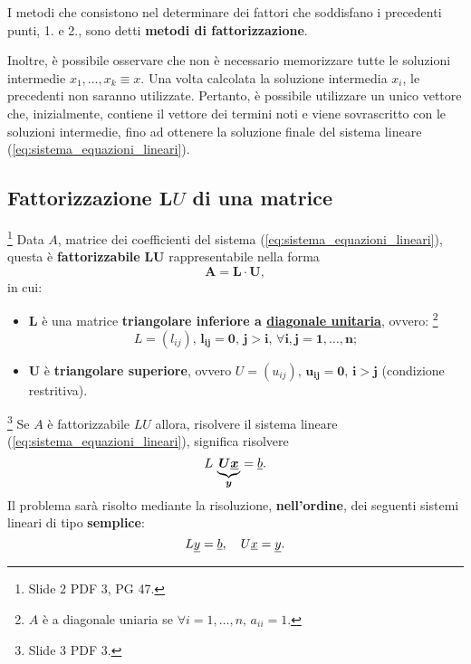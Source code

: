 I metodi che consistono nel determinare dei fattori che soddisfano i precedenti punti, 1. e 2., sono detti \textbf{metodi di fattorizzazione}.

Inoltre, è possibile osservare che non è necessario memorizzare tutte le soluzioni intermedie $x_1,\hdots, x_k\equiv x$. Una volta calcolata la soluzione intermedia $x_i$, le precedenti non saranno utilizzate. Pertanto, è possibile utilizzare un unico vettore che, inizialmente, contiene il vettore dei termini noti e viene sovrascritto con le soluzioni intermedie, fino ad ottenere la soluzione finale del sistema lineare (\ref{eq:sistema_equazioni_lineari}).

\subsection{Fattorizzazione \texorpdfstring{$\boldsymbol LU$}{LU} di una matrice}
\begin{definition}\footnote{Slide 2 PDF 3, PG 47.}
    Data $A$, matrice dei coefficienti del sistema (\ref{eq:sistema_equazioni_lineari}), questa è \textbf{fattorizzabile} $\boldsymbol{LU}$ rappresentabile nella forma
    \begin{equation}\label{eq:ALU}
        \boldsymbol{A=L\cdot U},
    \end{equation}
    in cui:
    \begin{itemize}
        \item $\boldsymbol L$ è una matrice \textbf{triangolare inferiore a \ul{diagonale unitaria}}, ovvero: \footnote{$A$ è a diagonale uniaria se $\forall i=1,\hdots, n,\, a_{ii}=1$.}
        \begin{equation*}
            L=(l_{ij}),\, \boldsymbol{l_{ij}=0,\, j>i,\, \forall i,j=1,\hdots, n};
        \end{equation*}
        \item $\boldsymbol U$ è \textbf{triangolare superiore}, ovvero $U=(u_{ij}),\, \boldsymbol{u_{ij}=0,\, i>j}$ (condizione restritiva).
    \end{itemize}
\end{definition}

\begin{remark}\footnote{Slide 3 PDF 3.}
    Se $A$ è fattorizzabile $LU$ allora, risolvere il sistema lineare (\ref{eq:sistema_equazioni_lineari}), significa risolvere
    \begin{equation*}
        L\, \underbrace{\boldsymbol{U\uline x}}_{\boldsymbol y}= \uline b.
    \end{equation*}
    Il problema sarà risolto mediante la risoluzione, \textbf{nell'ordine}, dei seguenti sistemi lineari di tipo \textbf{semplice}:
    \begin{equation*}
        L\uline y =\uline b,\quad U\uline x= \uline y.
    \end{equation*}
\end{remark}

